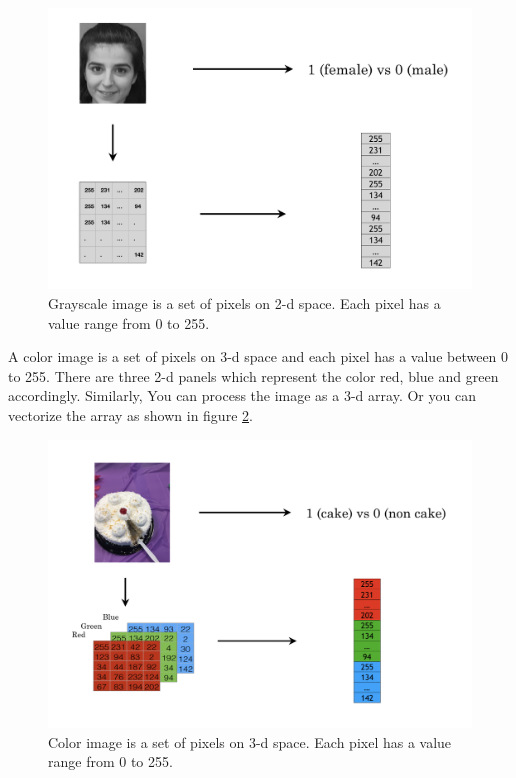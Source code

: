 \documentclass[12pt,]{krantz}
\begin{document}
\begin{figure}

{\centering \includegraphics[width=0.8\linewidth]{images/grayscaleimage} 

}

\caption{Grayscale image is a set of pixels on 2-d space. Each pixel has a value range from 0 to 255.}\label{fig:grayscaleimage}
\end{figure}

A color image is a set of pixels on 3-d space and each pixel has a value between 0 to 255. There are three 2-d panels which represent the color red, blue and green accordingly. Similarly, You can process the image as a 3-d array. Or you can vectorize the array as shown in figure \ref{fig:colorimage}.

\begin{figure}

{\centering \includegraphics[width=0.8\linewidth]{images/colorimage} 

}

\caption{Color image is a set of pixels on 3-d space. Each pixel has a value range from 0 to 255.}\label{fig:colorimage}
\end{figure}
\end{document}

